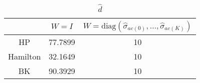 \documentclass[11pt]{article}
\renewcommand{\[}{\begin{equation}}
\renewcommand{\]}{\end{equation}}
\begin{document}
\begin{center}
\begin{table}[h!]
\caption{$\hat{d}$}
\begin{tabular}{ c |c |c }
  & $W = I$ & $W = \text{diag}(\hat{\sigma}_{ac(0)}, \dots, \hat{\sigma}_{ac(K)})$ \\ 
  \hline
 HP & 77.7899 & 10 \\  
 \hline
 Hamilton & 32.1649 & 10 \\  
 \hline
 BK & 90.3929 & 10    
\end{tabular}
\end{table}
\end{center}
\end{document}

